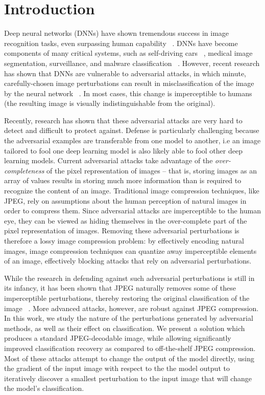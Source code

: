 \section{Introduction}
Deep neural networks (DNNs) have shown tremendous success in image recognition tasks, even surpassing human capability ~\cite{he2015deep}. 
DNNs have become components of many critical systems, such as self-driving cars ~\cite{bojarski2016end}, medical image segmentation, surveillance, and  malware classification ~\cite{pascanu2015malware}. However, recent research has shown that DNNs are vulnerable to adversarial attacks, in which minute, carefully-chosen image perturbations can result in misclassification of the image by the neural network ~\cite{Goodfellow2014ExplainingAH}.
In most cases, this change is imperceptible to humans (the resulting image is visually indistinguishable from the original).

Recently, research has shown that these adversarial attacks are very hard to detect and difficult to protect against.
Defense is particularly challenging because the adversarial examples are transferable from one model to another, i.e an image tailored to fool one deep learning model is also likely able to fool other deep learning models.
Current adversarial attacks take advantage of the \emph{over-completeness} of the pixel representation of images -- that is, storing images as an array of values results in storing much more information than is required to recognize the content of an image. Traditional image compression techniques, like JPEG, rely on assumptions about the human perception of natural images in order to compress them. Since adversarial attacks are imperceptible to the human eye, they can be viewed as hiding themselves in the over-complete part of the pixel representation of images. Removing these adversarial perturbations is therefore a lossy image compression problem: by effectively encoding natural images, image compression techniques can quantize away imperceptible elements of an image, effectively blocking attacks that rely on adversarial perturbations.

While the research in defending against such adversarial perturbations is still in its infancy, it has been shown that JPEG naturally removes some of these imperceptible  perturbations, thereby restoring the original classification of the image ~\cite{Das2017KeepingTB,Dziugaite2016ASO}.
More advanced attacks, however, are robust against JPEG compression.
In this work, we study the nature of the perturbations generated by adversarial methods, as well as their effect on classification. We present a solution which produces a standard JPEG-decodable image, while allowing significantly improved classification recovery as compared to off-the-shelf JPEG compression.
Most of these attacks attempt to change the output of the model directly, using the gradient of the input image with respect to the the model output to iteratively discover a smallest perturbation to the input image that will change the model's classification. 


